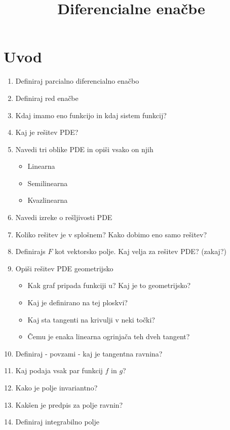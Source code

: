 \documentclass{article}
\title{Diferencialne enačbe}
\begin{document}
    \maketitle
    
    \section{Uvod}
    \begin{enumerate}
        \item Definiraj parcialno diferencialno enačbo
        \item Definiraj red enačbe
        \item Kdaj imamo eno funkcijo in kdaj sistem funkcij?
        \item Kaj je rešitev PDE?
        \item Navedi tri oblike PDE in opiši vsako on njih
        \begin{itemize}
            \item Linearna
            \item Semilinearna
            \item Kvazlinearna
        \end{itemize}
        \item Navedi izreke o rešljivosti PDE
        \item Koliko rešitev je v splošnem? Kako dobimo eno samo rešitev?
        \item Definirajs $F$ kot vektorsko polje. Kaj velja za rešitev PDE? (zakaj?)
        \item Opiši rešitev PDE geometrijsko
        \begin{itemize}
            \item Kak graf pripada funkciji u? Kaj je to geometrijsko?
            \item Kaj je definirano na tej ploskvi?
            \item Kaj sta tangenti na krivulji v neki točki?
            \item Čemu je enaka linearna ogrinjača teh dveh tangent?
        \end{itemize}
        \item Definiraj - povzami - kaj je tangentna ravnina?
        \item Kaj podaja vsak par funkcij $f$ in $g$?
        \item Kako je polje invariantno?
        \item Kakšen je predpis za polje ravnin?
        \item Definiraj integrabilno polje

\end{enumerate}
\end{document}
